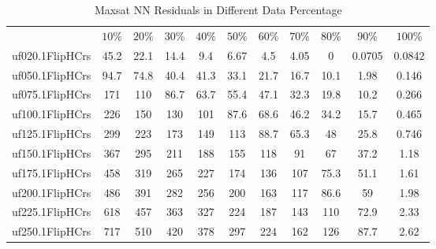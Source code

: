 \begin{table}[htbp]
\caption{Maxsat NN Residuals in Different Data Percentage}
\centering
\begin{tabular}{|ccccccccccc|}
\hline
 & $10\%$ & $20\%$ & $30\%$ & $40\%$ & $50\%$ & $60\%$ & $70\%$ & $80\%$ & $90\%$ & $100\%$ \\
uf020.1FlipHCrs & 45.2 & 22.1 & 14.4 &  9.4 & 6.67 &  4.5 & 4.05 &    0 & 0.0705 & 0.0842 \\
uf050.1FlipHCrs & 94.7 & 74.8 & 40.4 & 41.3 & 33.1 & 21.7 & 16.7 & 10.1 & 1.98 & 0.146 \\
uf075.1FlipHCrs &  171 &  110 & 86.7 & 63.7 & 55.4 & 47.1 & 32.3 & 19.8 & 10.2 & 0.266 \\
uf100.1FlipHCrs &  226 &  150 &  130 &  101 & 87.6 & 68.6 & 46.2 & 34.2 & 15.7 & 0.465 \\
uf125.1FlipHCrs &  299 &  223 &  173 &  149 &  113 & 88.7 & 65.3 &   48 & 25.8 & 0.746 \\
uf150.1FlipHCrs &  367 &  295 &  211 &  188 &  155 &  118 &   91 &   67 & 37.2 & 1.18 \\
uf175.1FlipHCrs &  458 &  319 &  265 &  227 &  174 &  136 &  107 & 75.3 & 51.1 & 1.61 \\
uf200.1FlipHCrs &  486 &  391 &  282 &  256 &  200 &  163 &  117 & 86.6 &   59 & 1.98 \\
uf225.1FlipHCrs &  618 &  457 &  363 &  327 &  224 &  187 &  143 &  110 & 72.9 & 2.33 \\
uf250.1FlipHCrs &  717 &  510 &  420 &  378 &  297 &  224 &  162 &  126 & 87.7 & 2.62 \\
\hline
\end{tabular}
\end{table}
